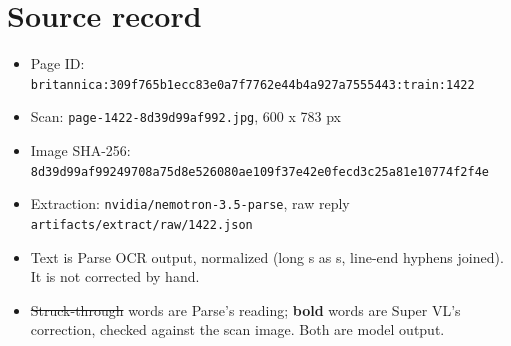 \documentclass[10pt]{article}
\begin{document}
\section*{Source record}
\begin{itemize}
\item Page ID: \texttt{britannica:309f765b1ecc83e0a7f7762e44b4a927a7555443:train:1422}
\item Scan: \texttt{page-1422-8d39d99af992.jpg}, 600 x 783 px
\item Image SHA-256: \texttt{\small 8d39d99af99249708a75d8e526080ae109f37e42e0fecd3c25a81e10774f2f4e}
\item Extraction: \texttt{nvidia/nemotron-3.5-parse}, raw reply \texttt{artifacts/extract/raw/1422.json}
\item Text is Parse OCR output, normalized (long s as s, line-end hyphens joined). It is not corrected by hand.
\item \sout{Struck-through} words are Parse's reading; \textbf{bold} words are Super VL's correction, checked against the scan image. Both are model output.
\end{itemize}
\end{document}
